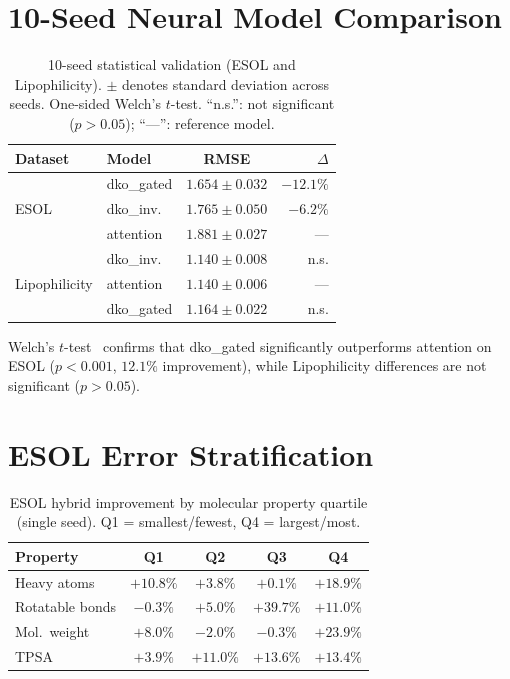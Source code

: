 \documentclass[sigconf]{acmart}
\begin{document}
\section{10-Seed Neural Model Comparison}
\label{app:stat_neural}

\begin{table}[ht]
\caption{10-seed statistical validation (ESOL and Lipophilicity). $\pm$ denotes standard deviation across seeds. One-sided Welch's $t$-test. ``n.s.'': not significant ($p > 0.05$); ``---'': reference model.}
\label{tab:stat}
\centering
\small
\begin{tabular}{@{}llcr@{}}
\toprule
Dataset & Model & RMSE & $\Delta$ \\
\midrule
\multirow{3}{*}{ESOL} & dko\_gated & $1.654{\pm}0.032$ & $-12.1\%$ \\
                       & dko\_inv. & $1.765{\pm}0.050$ & $-6.2\%$ \\
                       & attention & $1.881{\pm}0.027$ & --- \\
\midrule
\multirow{3}{*}{Lipophilicity}  & dko\_inv. & $1.140{\pm}0.008$ & n.s. \\
                       & attention & $1.140{\pm}0.006$ & --- \\
                       & dko\_gated & $1.164{\pm}0.022$ & n.s. \\
\bottomrule
\end{tabular}
\end{table}

Welch's $t$-test~\cite{welch1947ttest} confirms that dko\_gated significantly outperforms attention on ESOL ($p < 0.001$, $12.1\%$ improvement), while Lipophilicity differences are not significant ($p > 0.05$).

\section{ESOL Error Stratification}
\label{app:error_esol}

\begin{table}[ht]
\caption{ESOL hybrid improvement by molecular property quartile (single seed). Q1 = smallest/fewest, Q4 = largest/most.}
\label{tab:error}
\centering
\small
\begin{tabular}{@{}lcccc@{}}
\toprule
Property & Q1 & Q2 & Q3 & Q4 \\
\midrule
Heavy atoms     & $+10.8\%$ & $+3.8\%$  & $+0.1\%$  & $\mathbf{+18.9\%}$ \\
Rotatable bonds & $-0.3\%$  & $+5.0\%$  & $\mathbf{+39.7\%}$ & $+11.0\%$ \\
Mol.\ weight    & $+8.0\%$  & $-2.0\%$  & $-0.3\%$  & $\mathbf{+23.9\%}$ \\
TPSA            & $+3.9\%$  & $+11.0\%$ & $+13.6\%$ & $+13.4\%$ \\
\bottomrule
\end{tabular}
\end{table}
\end{document}
